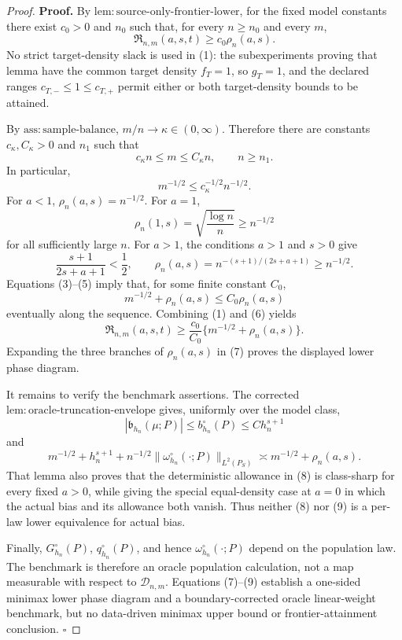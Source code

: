 \documentclass{article}
\begin{document}
\begin{proof}
\textbf{Proof.}
By \(\mathrm{lem:source\text{-}only\text{-}frontier\text{-}lower}\), for the fixed model constants there exist \(c_0>0\) and \(n_0\) such that, for every \(n\ge n_0\) and every \(m\),
\[
\mathfrak R_{n,m}(a,s,t)\ge c_0\rho_n(a,s).
\tag{1}
\]
No strict target-density slack is used in (1): the subexperiments proving that lemma have the common target density \(f_T=1\), so \(g_T=1\), and the declared ranges \(c_{T,-}\le1\le c_{T,+}\) permit either or both target-density bounds to be attained.

By \(\mathrm{ass:sample\text{-}balance}\), \(m/n\to\kappa\in(0,\infty)\). Therefore there are constants \(c_\kappa,C_\kappa>0\) and \(n_1\) such that
\[
c_\kappa n\le m\le C_\kappa n,
\qquad n\ge n_1.
\tag{2}
\]
In particular,
\[
m^{-1/2}\le c_\kappa^{-1/2}n^{-1/2}.
\tag{3}
\]
For \(a<1\), \(\rho_n(a,s)=n^{-1/2}\). For \(a=1\),
\[
\rho_n(1,s)=\sqrt{\frac{\log n}{n}}\ge n^{-1/2}
\tag{4}
\]
for all sufficiently large \(n\). For \(a>1\), the conditions \(a>1\) and \(s>0\) give
\[
\frac{s+1}{2s+a+1}<\frac12,
\qquad
\rho_n(a,s)=n^{-(s+1)/(2s+a+1)}\ge n^{-1/2}.
\tag{5}
\]
Equations (3)--(5) imply that, for some finite constant \(C_0\),
\[
m^{-1/2}+\rho_n(a,s)\le C_0\rho_n(a,s)
\tag{6}
\]
eventually along the sequence. Combining (1) and (6) yields
\[
\mathfrak R_{n,m}(a,s,t)
\ge \frac{c_0}{C_0}\{m^{-1/2}+\rho_n(a,s)\}.
\tag{7}
\]
Expanding the three branches of \(\rho_n(a,s)\) in (7) proves the displayed lower phase diagram.

It remains to verify the benchmark assertions. The corrected
\(\mathrm{lem:oracle\text{-}truncation\text{-}envelope}\) gives, uniformly over the model class,
\[
|\mathfrak b_{h_n}(\mu;P)|\le b_{h_n}^{\circ}(P)\le C h_n^{s+1}
\tag{8}
\]
and
\[
m^{-1/2}+h_n^{s+1}
+n^{-1/2}\|\omega_{h_n}^{\circ}(\cdot;P)\|_{L^2(P_S)}
\asymp m^{-1/2}+\rho_n(a,s).
\tag{9}
\]
That lemma also proves that the deterministic allowance in (8) is class-sharp for every fixed \(a>0\), while giving the special equal-density case at \(a=0\) in which the actual bias and its allowance both vanish. Thus neither (8) nor (9) is a per-law lower equivalence for actual bias.

Finally, \(G_{h_n}^{\circ}(P)\), \(q_{h_n}^{\circ}(P)\), and hence \(\omega_{h_n}^{\circ}(\cdot;P)\) depend on the population law. The benchmark is therefore an oracle population calculation, not a map measurable with respect to \(\mathcal D_{n,m}\). Equations (7)--(9) establish a one-sided minimax lower phase diagram and a boundary-corrected oracle linear-weight benchmark, but no data-driven minimax upper bound or frontier-attainment conclusion. \(\square\)
\end{proof}
\end{document}
